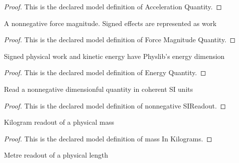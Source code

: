 \begin{proof}
  This is the declared model definition of Acceleration Quantity.
\end{proof}
\begin{definition}
  \label{def:physics:phyx-mini-0808:phyxminiproblems-problemphyxmini0808-forcemagnitudequantity}
  A nonnegative force magnitude. Signed effects are represented as work
\end{definition}
\begin{proof}
  This is the declared model definition of Force Magnitude Quantity.
\end{proof}
\begin{definition}
  \label{def:physics:phyx-mini-0808:phyxminiproblems-problemphyxmini0808-energyquantity}
  Signed physical work and kinetic energy have Physlib's energy dimension
\end{definition}
\begin{proof}
  This is the declared model definition of Energy Quantity.
\end{proof}
\begin{definition}
  \label{def:physics:phyx-mini-0808:phyxminiproblems-problemphyxmini0808-nonnegativesireadout}
  Read a nonnegative dimensionful quantity in coherent SI units
\end{definition}
\begin{proof}
  This is the declared model definition of nonnegative SIReadout.
\end{proof}
\begin{definition}
  \label{def:physics:phyx-mini-0808:phyxminiproblems-problemphyxmini0808-massinkilograms}
  Kilogram readout of a physical mass
\end{definition}
\begin{proof}
  This is the declared model definition of mass In Kilograms.
\end{proof}
\begin{definition}
  \label{def:physics:phyx-mini-0808:phyxminiproblems-problemphyxmini0808-lengthinmeters}
  Metre readout of a physical length
\end{definition}
